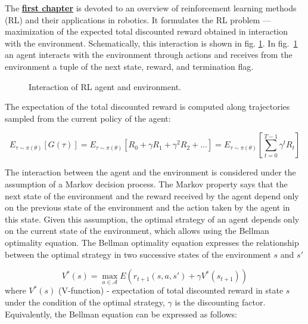 The \underline{\textbf{first chapter}} is devoted to an overview of reinforcement learning methods (RL) and their applications in robotics. It formulates the RL problem --- maximization of the expected total discounted reward obtained in interaction with the environment. Schematically, this interaction is shown in fig. \ref{fig:rl_setting}. In fig.~\ref{fig:rl_setting} an agent interacts with the environment through actions and receives from the environment a tuple of the next state, reward, and termination flag. 

\begin{figure}[ht]
    \caption{Interaction of RL agent and environment.}\label{fig:rl_setting}
\end{figure}

The expectation of the total discounted reward is computed along trajectories sampled from the current policy of the agent:

\[
E_{\tau \sim \pi(\theta)} [G(\tau)] = E_{\tau \sim \pi(\theta)} [R_0 + \gamma R_{1} + \gamma ^ 2 R_{2} + ...] = E_{\tau \sim \pi(\theta)} [\sum_{t=0}^{T - 1} \gamma ^t R_{t}]
\]

The interaction between the agent and the environment is considered under the assumption of a Markov decision process. The Markov property says that the next state of the environment and the reward received by the agent depend only on the previous state of the environment and the action taken by the agent in this state. Given this assumption, the optimal strategy of an agent depends only on the current state of the environment, which allows using the Bellman optimality equation. The Bellman optimality equation expresses the relationship between the optimal strategy in two successive states of the environment $s$ and $s'$

\[
	V^*(s) = \max_{a \in \mathcal{A}} E(r_{t + 1}(s, a, s') + \gamma V^*(s_{t + 1}))
\]
where $V^*(s)$ (V-function) - expectation of total discounted reward in state $s$ under the condition of the optimal strategy, $\gamma$ is the discounting factor. Equivalently, the Bellman equation can be expressed as follows: 

